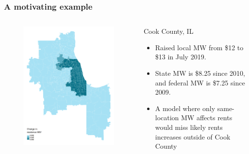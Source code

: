 \documentclass[aspectratio=169, t]{beamer}
\begin{document}
\begin{frame}
    \frametitle{A motivating example}
    \begin{columns}
        \begin{column}{0.44\textwidth}
            \vspace{-8mm}
            \begin{figure}
                \centering
                \includegraphics[scale = 0.38]{maps_events/output/chicago_2019-6_statutory_mw.png}
            \end{figure}   
        \end{column}
        \begin{column}{0.56\textwidth}
            Cook County, IL
            \begin{itemize}
                \item Raised local MW from \$12 to \$13 in July 2019. 
                \item State MW is \$8.25 since 2010, and federal MW is \$7.25 since 2009.
                \vspace{2mm}
                \pause
                \item A model where only same-location MW affects rents 
                would miss likely rents increases outside of Cook County
            \end{itemize}
        \end{column}
    \end{columns}
\end{frame}
\end{document}
